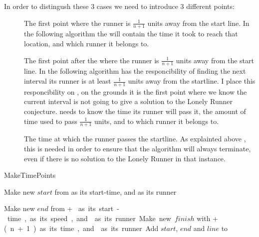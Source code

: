 In order to distingush these 3 cases we need to introduce 3 different points:
\begin{description}
\item[\comStart] The first point where the runner is $\frac{1}{n + 1}$ units away from the start line. In the following algorithm the \comStart will contain the time it took to reach that location, and which runner it belongs to.
\item[\comEnd] The first point after the \comStart where the runner is $\frac{1}{n + 1}$ units away from the start line. In the following algorithm \comEnd has the responcibility of finding the next interval its runner is at least $\frac{1}{n+1}$ units away from the startline. I place this responcibility on \comEnd, on the grounds it is the first point where we know the current interval is not going to give a solution to the Lonely Runner conjecture. \comEnd needs to know the time its runner will pass it, the amount of time used to pass $\frac{1}{n+1}$ units, and to which runner it belongs to.
\item[\comFin] The time at which the runner passes the startline. As explainted above , this is needed in order to ensure that the algorithm will always terminate, even if there is no solution to the Lonely Runner in that instance.
\end{description}

\begin{algorithm}[H]
\caption{MakeTimePoints}
\highlights
{}
 
Make new \startT $start$ from \start as its start-time, and \run as its runner 
  
Make new \eT $end$ from \start + \unit * \n as its start-time, \unit as its speed, and \run as its runner
  
Make new \finish $finish$ with \start + \unit * (n+1) as its time, and \run as its runner
  
Add $start$, $end$ and $line$ to \li

\return \li
\end{algorithm}

